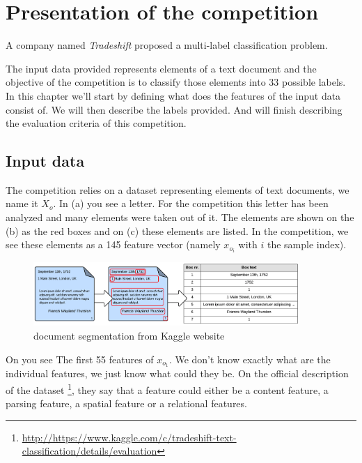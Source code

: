 




\section{Presentation of the competition}
\label{sec:competition}

	A company named \textit{Tradeshift} proposed a multi-label classification problem. 
	
	The input data provided represents elements of a text document and the objective of the competition is to classify those elements into 33 possible labels.
	In this chapter we'll start by defining what does the features of the input data consist of. We will then describe the labels provided. And will finish describing the evaluation criteria of this competition.


	\subsection{Input data}
	\label{sec:dataset}

		The competition relies on a dataset representing elements of text documents, we name it $X_o$. In (a) you see a letter. For the competition this letter has been analyzed and many elements were taken out of it. The elements are shown on the (b) as the red boxes and on (c) these elements are listed. In the competition, we see these elements as a 145 feature vector (namely $x_{o_i}$ with $i$ the sample index).

		\begin{figure}[h]
			\begin{center}
				\includegraphics[width=0.9\textwidth]{FeatureExtraction1.png}
			\end{center}
			\caption{document segmentation from Kaggle website 
			\label{fig:FeatureExtraction1}}
		\end{figure}

		On  you see The first 55 features of $x_{o_1}$. We don't know exactly what are the individual features, we just know what could they be. On the official description of the dataset \footnote{\url{http://https://www.kaggle.com/c/tradeshift-text-classification/details/evaluation}}, they say that a feature could either be a content feature, a parsing feature, a spatial feature or a relational features.

